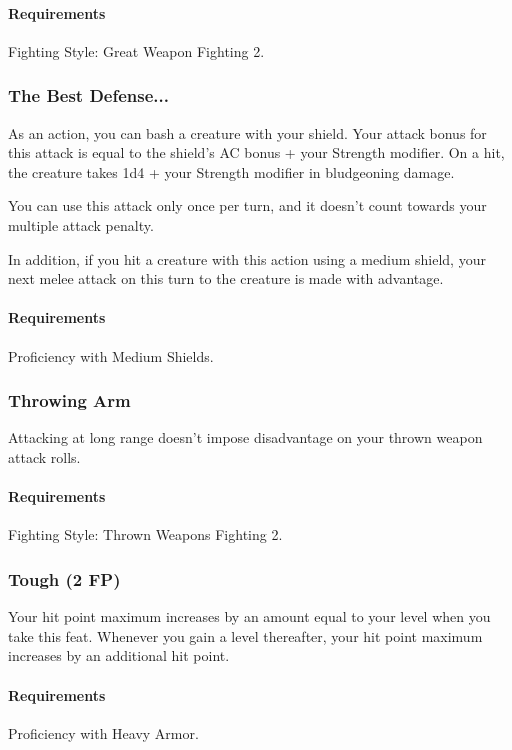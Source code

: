     \paragraph{Requirements} Fighting Style: Great Weapon Fighting 2.
\subsubsection{The Best Defense...} \label{feat::thebestdefense}
    As an action, you can bash a creature with your shield.
    Your attack bonus for this attack is equal to the shield's AC bonus + your Strength modifier.
    On a hit, the creature takes 1d4 + your Strength modifier in bludgeoning damage.

    You can use this attack only once per turn, and it doesn't count towards your multiple attack penalty.

    In addition, if you hit a creature with this action using a medium shield, your next melee attack on this turn to the creature is made with advantage.
    \paragraph{Requirements} Proficiency with Medium Shields.
\subsubsection{Throwing Arm} \label{feat::throwingarm}
    Attacking at long range doesn't impose disadvantage on your thrown weapon attack rolls.
    \paragraph{Requirements} Fighting Style: Thrown Weapons Fighting 2.
\subsubsection{Tough (2 FP)} \label{feat::tough}
    Your hit point maximum increases by an amount equal to your level when you take this feat.
    Whenever you gain a level thereafter, your hit point maximum increases by an additional hit point.
    \paragraph{Requirements} Proficiency with Heavy Armor.

